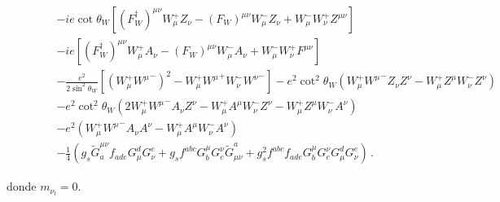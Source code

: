 \begin{frame}{}
\begin{align}
     \label{eq:234qft}
\phantom{\mathcal{L}_{\text{SM}}=}&-ie\cot\theta_W\left[(F_W^\dagger)^{\mu\nu}W_\mu^+ Z_\nu-(F_W)^{\mu\nu}W_\mu^- Z_\nu+W_\mu^-W_\nu^+Z^{\mu\nu}\right]\nonumber\\
&-ie\left[(F_W^\dagger)^{\mu\nu}W_\mu^+ A_\nu-(F_W)^{\mu\nu}W_\mu^- A_\nu+W_\mu^-W_\nu^+F^{\mu\nu}\right]\nonumber\\
&-\frac{e^2}{2\sin^2\theta_W}\left[\left(W_\mu^+{W^\mu}^-\right)^2-W_\mu^+{W^\mu}^+W_\nu^-{W^\nu}^-\right]
-e^2\cot^2\theta_W\left(W_\mu^+{W^\mu}^-Z_\nu Z^\nu-W_\mu^+Z^\mu W_\nu^-Z^\nu\right)\nonumber\\
&-e^2\cot^2\theta_W\left(2W_\mu^+{W^\mu}^-A_\nu Z^\nu-W_\mu^+A^\mu W_\nu^-Z^\nu-W_\mu^+Z^\mu W_\nu^-A^\nu\right)\nonumber\\
&-e^2\left(W_\mu^+{W^\mu}^-A_\nu A^\nu-W_\mu^+A^\mu W_\nu^-A^\nu\right)\nonumber\\
&- \frac{1}{4}\left(g_s\widetilde{G}^{\mu\nu}_af_{a d e}G^d_\mu G^e_\nu
    +g_sf^{a b c}G_b^\mu G_c^\nu\widetilde{G}_{\mu\nu}^a
    +g_s^2f^{a b c}f_{a d e}G_b^\mu G_c^\nu G^d_\mu G^e_\nu\right)\,.
\end{align}


donde $m_{\nu_l}=0$.

\end{frame}


